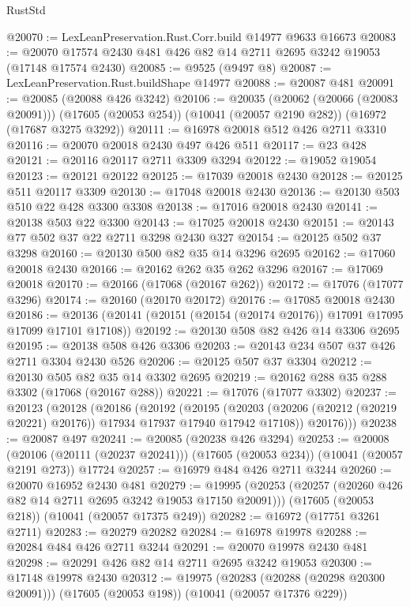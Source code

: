 \begin{lexlean}{RustStd}
\begin{coremodule}
@20070 := LexLeanPreservation.Rust.Corr.build @14977 @9633 @16673
@20083 := @20070 @17574 @2430 @481 @426 @82 @14 @2711 @2695 @3242 @19053 (@17148 @17574 @2430)
@20085 := @9525 (@9497 @8)
@20087 := LexLeanPreservation.Rust.buildShape @14977
@20088 := @20087 @481
@20091 := @20085 (@20088 @426 @3242)
@20106 := @20035
    (@20062 (@20066 (@20083 @20091)))
    (@17605 (@20053 @254))
    (@10041 (@20057 @2190 @282))
    (@16972 (@17687 @3275 @3292))
@20111 := @16978 @20018 @512 @426 @2711 @3310
@20116 := @20070 @20018 @2430 @497 @426 @511
@20117 := @23 @428
@20121 := @20116 @20117 @2711 @3309 @3294
@20122 := @19052 @19054
@20123 := @20121 @20122
@20125 := @17039 @20018 @2430
@20128 := @20125 @511 @20117 @3309
@20130 := @17048 @20018 @2430
@20136 := @20130 @503 @510 @22 @428 @3300 @3308
@20138 := @17016 @20018 @2430
@20141 := @20138 @503 @22 @3300
@20143 := @17025 @20018 @2430
@20151 := @20143 @77 @502 @37 @22 @2711 @3298 @2430 @327
@20154 := @20125 @502 @37 @3298
@20160 := @20130 @500 @82 @35 @14 @3296 @2695
@20162 := @17060 @20018 @2430
@20166 := @20162 @262 @35 @262 @3296
@20167 := @17069 @20018
@20170 := @20166 (@17068 (@20167 @262))
@20172 := @17076 (@17077 @3296)
@20174 := @20160 (@20170 @20172)
@20176 := @17085 @20018 @2430
@20186 := @20136 (@20141 (@20151 (@20154 (@20174 @20176)) @17091 @17095 @17099 @17101 @17108))
@20192 := @20130 @508 @82 @426 @14 @3306 @2695
@20195 := @20138 @508 @426 @3306
@20203 := @20143 @234 @507 @37 @426 @2711 @3304 @2430 @526
@20206 := @20125 @507 @37 @3304
@20212 := @20130 @505 @82 @35 @14 @3302 @2695
@20219 := @20162 @288 @35 @288 @3302 (@17068 (@20167 @288))
@20221 := @17076 (@17077 @3302)
@20237 := @20123
    (@20128
      (@20186
        (@20192
          (@20195
            (@20203 (@20206 (@20212 (@20219 @20221) @20176)) @17934 @17937 @17940 @17942 @17108))
          @20176)))
@20238 := @20087 @497
@20241 := @20085 (@20238 @426 @3294)
@20253 := @20008
    (@20106 (@20111 (@20237 @20241)))
    (@17605 (@20053 @234))
    (@10041 (@20057 @2191 @273))
    @17724
@20257 := @16979 @484 @426 @2711 @3244
@20260 := @20070 @16952 @2430 @481
@20279 := @19995
    (@20253 (@20257 (@20260 @426 @82 @14 @2711 @2695 @3242 @19053 @17150 @20091)))
    (@17605 (@20053 @218))
    (@10041 (@20057 @17375 @249))
@20282 := @16972 (@17751 @3261 @2711)
@20283 := @20279 @20282
@20284 := @16978 @19978
@20288 := @20284 @484 @426 @2711 @3244
@20291 := @20070 @19978 @2430 @481
@20298 := @20291 @426 @82 @14 @2711 @2695 @3242 @19053
@20300 := @17148 @19978 @2430
@20312 := @19975
    (@20283 (@20288 (@20298 @20300 @20091)))
    (@17605 (@20053 @198))
    (@10041 (@20057 @17376 @229))

\end{coremodule}
\end{lexlean}
